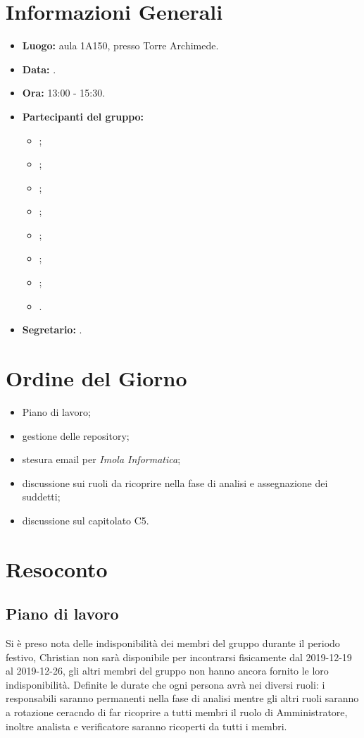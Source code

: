 \section{Informazioni Generali}
\begin{itemize}
\item \textbf{Luogo:} aula 1A150, presso Torre Archimede.
\item \textbf{Data:} \Data.
\item \textbf{Ora:} 13:00 - 15:30.
\item \textbf{Partecipanti del gruppo:}
	\begin{itemize}
		\item \AT; 
		\item \BR;
		\item \CE; 
		\item \DF;
		\item \LD;
		\item \MC;
		\item \PF;
		\item \SE.
	\end{itemize} 
\item \textbf{Segretario:} \LD.
\end{itemize}


\section{Ordine del Giorno}
\begin{itemize}
\item Piano di lavoro;
\item gestione delle repository;
\item stesura email per \textit{Imola Informatica};
\item discussione sui ruoli da ricoprire nella fase di analisi e assegnazione dei suddetti;
\item discussione sul capitolato C5.
\end{itemize}



\section{Resoconto}
\subsection{Piano di lavoro}
Si è preso nota delle indisponibilità dei membri del gruppo durante il periodo festivo, Christian non sarà disponibile per incontrarsi fisicamente dal 2019-12-19 al 2019-12-26, gli altri membri del gruppo non hanno ancora fornito le loro indisponibilità. 
Definite le durate che ogni persona avrà nei diversi ruoli: i responsabili saranno permanenti nella fase di analisi mentre gli altri ruoli saranno a rotazione ceracndo di far ricoprire a tutti membri il ruolo di Amministratore, inoltre analista e verificatore saranno ricoperti da tutti i membri.  \\

